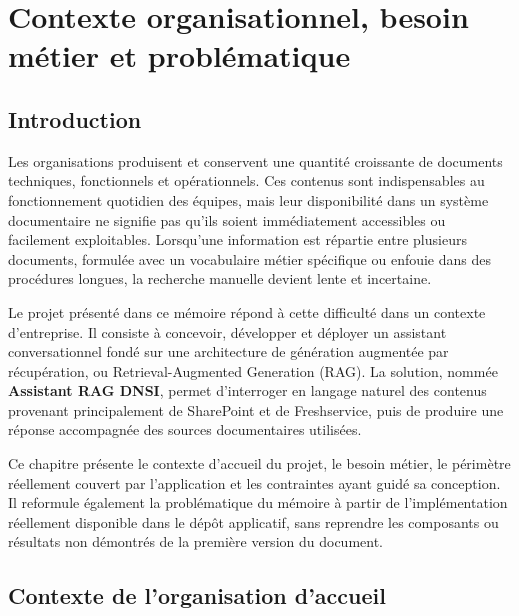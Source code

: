 
\chapter{Contexte organisationnel, besoin métier et problématique}
\label{chap:contexte_problematique}

\section{Introduction}

Les organisations produisent et conservent une quantité croissante de documents techniques, fonctionnels et opérationnels. Ces contenus sont indispensables au fonctionnement quotidien des équipes, mais leur disponibilité dans un système documentaire ne signifie pas qu'ils soient immédiatement accessibles ou facilement exploitables. Lorsqu'une information est répartie entre plusieurs documents, formulée avec un vocabulaire métier spécifique ou enfouie dans des procédures longues, la recherche manuelle devient lente et incertaine.

Le projet présenté dans ce mémoire répond à cette difficulté dans un contexte d'entreprise. Il consiste à concevoir, développer et déployer un assistant conversationnel fondé sur une architecture de génération augmentée par récupération, ou Retrieval-Augmented Generation (RAG). La solution, nommée \textbf{Assistant RAG DNSI}, permet d'interroger en langage naturel des contenus provenant principalement de SharePoint et de Freshservice, puis de produire une réponse accompagnée des sources documentaires utilisées.

Ce chapitre présente le contexte d'accueil du projet, le besoin métier, le périmètre réellement couvert par l'application et les contraintes ayant guidé sa conception. Il reformule également la problématique du mémoire à partir de l'implémentation réellement disponible dans le dépôt applicatif, sans reprendre les composants ou résultats non démontrés de la première version du document.

\section{Contexte de l'organisation d'accueil}


